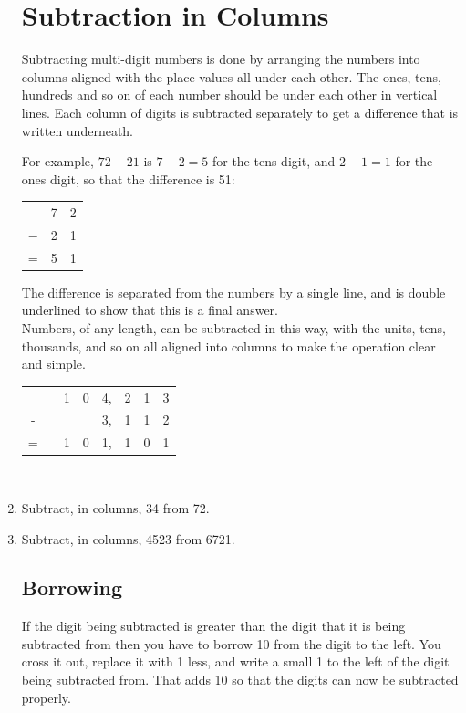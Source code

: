 \documentclass[12pt]{article}
\begin{document}
\begin{enumerate}
\section*{Subtraction in Columns}

Subtracting multi-digit numbers is done by arranging the numbers into columns aligned with the place-values all under each other. The ones, tens, hundreds and so on of each number should be under each other in vertical lines. Each column of digits is subtracted separately to get a difference that is written underneath.

For example, $72 - 21$ is $7 - 2 = 5$ for the tens digit, and $2 - 1 = 1$ for the ones digit, so that the difference is 51:

\begin{center}
\begin{tabular}{c@{\,}c@{\,}c@{\,}}
 &7&2\\
$-$&2&1\\
\hline
=&5&1\\
\hline
\hline
\end{tabular}
\end{center}

The difference is separated from the numbers by a single line, and is double underlined to show that this is a final answer.\\

Numbers, of any length, can be subtracted in this way, with the units, tens, thousands, and so on all aligned into columns to make the operation clear and simple.

\begin{center}
\begin{tabular}{c@{\,}c@{\,}c@{\,}c@{\,}c@{\,}c@{\,}c@{\,}c@{\,}}
  & &1&0&4,&2&1&3\\
 -& & & &3,&1&1&2\\
\hline
= & &1&0&1,&1&0&1\\
\hline
\hline
\end{tabular}\\
\end{center}

\item Subtract, in columns, 34 from 72.
\item Subtract, in columns, 4523 from 6721.

\newpage

\subsection*{Borrowing}
If the digit being subtracted is greater than the digit that it is being subtracted from then you have to borrow 10 from the digit to the left. You cross it out, replace it with 1 less, and write a small 1 to the left of the digit being subtracted from. That adds 10 so that the digits can now be subtracted properly.\\


\end{enumerate}
\end{document}
